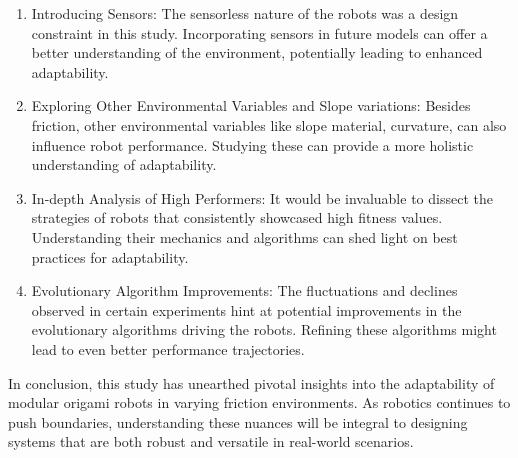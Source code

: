 \documentclass{sigchi}
\begin{document}
\begin{enumerate}
    \item Introducing Sensors: The sensorless nature of the robots was a design constraint in this study. Incorporating sensors in future models can offer a better understanding of the environment, potentially leading to enhanced adaptability.
    \item Exploring Other Environmental Variables and Slope variations: Besides friction, other environmental variables like slope material, curvature,  can also influence robot performance. Studying these can provide a more holistic understanding of adaptability.
    \item In-depth Analysis of High Performers: It would be invaluable to dissect the strategies of robots that consistently showcased high fitness values. Understanding their mechanics and algorithms can shed light on best practices for adaptability.
    \item Evolutionary Algorithm Improvements: The fluctuations and declines observed in certain experiments hint at potential improvements in the evolutionary algorithms driving the robots. Refining these algorithms might lead to even better performance trajectories.
\end{enumerate}
In conclusion, this study has unearthed pivotal insights into the adaptability of modular origami robots in varying friction environments. As robotics continues to push boundaries, understanding these nuances will be integral to designing systems that are both robust and versatile in real-world scenarios.

 
\balance{}



\end{document}
